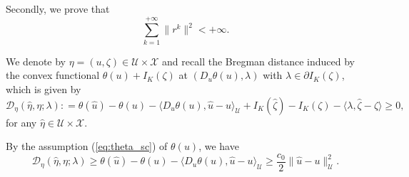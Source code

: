 \documentclass[leqno]{amsart}
\theoremstyle{definition}
\begin{document}
Secondly, we prove that
$$\sum\limits_{k= 1}^{+\infty}\|r^{k}\|^2< +\infty.$$

We denote by $\eta = (u,\zeta)\in \mathcal{U}\times \mathcal{X}$ and recall the Bregman distance induced by the convex functional $\theta(u) + I_K(\zeta)$ at $(D_u\theta(u), \lambda)$ with $\lambda\in \partial I_K(\zeta)$, which is given by
\begin{equation}\label{eq:Bregman}
\mathcal{D}_{\eta}(\hat{\eta},\eta; \lambda): = \theta(\hat{u}) - \theta(u) - \langle D_u\theta(u), \hat{u} - u\rangle_\mathcal{U} + I_K(\hat{\zeta}) - I_K(\zeta) - \langle \lambda, \hat{\zeta} - \zeta\rangle\geq 0,
\end{equation}
for any $\hat{\eta}\in \mathcal{U}\times \mathcal{X}$.

By the assumption (\ref{eq:theta_sc}) of $\theta(u)$, we have
\begin{equation}\label{eq:Breg_Elliptic}
\mathcal{D}_{\eta}(\hat{\eta},\eta; \lambda) 
 \geq \theta(\hat{u}) - \theta(u) - \langle D_u\theta(u), \hat{u} - u\rangle_\mathcal{U}
 \geq \frac{c_0}{2}\|\hat{u} - u\|_{\mathcal{U}}^2.
\end{equation}
\end{document}
